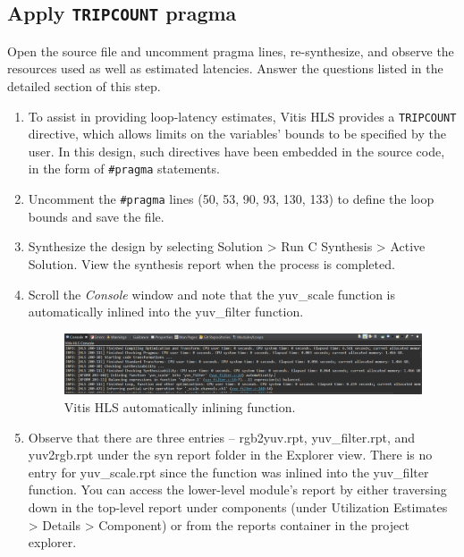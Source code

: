 \documentclass[a4paper,12pt,twoside]{article}
\begin{document}
\subsection{Apply \texttt{TRIPCOUNT} pragma}\label{S23}
Open the source file and uncomment pragma lines, re-synthesize, and observe the resources used as well as estimated latencies. Answer the questions listed in the detailed section of this step.
\begin{enumerate}
    \item To assist in providing loop-latency estimates, Vitis HLS provides a \texttt{TRIPCOUNT} directive, which allows limits on the variables' bounds to be specified by the user. In this design, such directives have been embedded in the source code, in the form of \texttt{\#pragma} statements.
    \item Uncomment the \texttt{\#pragma} lines (50, 53, 90, 93, 130, 133) to define the loop bounds and save the file.
    \item Synthesize the design by selecting Solution > Run C Synthesis > Active Solution. View the synthesis report when the process is completed.
    \item Scroll the \textit{Console} window and note that the yuv\_scale function is automatically inlined into the yuv\_filter function.
    \begin{figure}[H]
        \centering
        \includegraphics[width=\textwidth]{images/2.png}
        \caption{Vitis HLS automatically inlining function.}
    \end{figure}
    \item Observe that there are three entries – rgb2yuv.rpt, yuv\_filter.rpt, and yuv2rgb.rpt under the syn report folder in the Explorer view. There is no entry for yuv\_scale.rpt since the function was inlined into the yuv\_filter function. You can access the lower-level module’s report by either traversing down in the top-level report under components (under Utilization Estimates > Details > Component) or from the reports container in the project explorer.

\end{enumerate}
\end{document}
